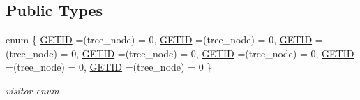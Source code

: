 \subsection*{Public Types}
\begin{DoxyCompactItemize}
\item 
enum \{ \newline
\hyperlink{structssa__name_a4b332ba658ffab03622b3819941428f8af81ecc8f49b033e7540c4e331cc66c9a}{G\+E\+T\+ID} =(tree\+\_\+node) = 0, 
\hyperlink{structssa__name_a4b332ba658ffab03622b3819941428f8af81ecc8f49b033e7540c4e331cc66c9a}{G\+E\+T\+ID} =(tree\+\_\+node) = 0, 
\hyperlink{structssa__name_a4b332ba658ffab03622b3819941428f8af81ecc8f49b033e7540c4e331cc66c9a}{G\+E\+T\+ID} =(tree\+\_\+node) = 0, 
\hyperlink{structssa__name_a4b332ba658ffab03622b3819941428f8af81ecc8f49b033e7540c4e331cc66c9a}{G\+E\+T\+ID} =(tree\+\_\+node) = 0, 
\newline
\hyperlink{structssa__name_a4b332ba658ffab03622b3819941428f8af81ecc8f49b033e7540c4e331cc66c9a}{G\+E\+T\+ID} =(tree\+\_\+node) = 0, 
\hyperlink{structssa__name_a4b332ba658ffab03622b3819941428f8af81ecc8f49b033e7540c4e331cc66c9a}{G\+E\+T\+ID} =(tree\+\_\+node) = 0, 
\hyperlink{structssa__name_a4b332ba658ffab03622b3819941428f8af81ecc8f49b033e7540c4e331cc66c9a}{G\+E\+T\+ID} =(tree\+\_\+node) = 0
 \}\begin{DoxyCompactList}\small\item\em visitor enum \end{DoxyCompactList}
\end{DoxyCompactItemize}
